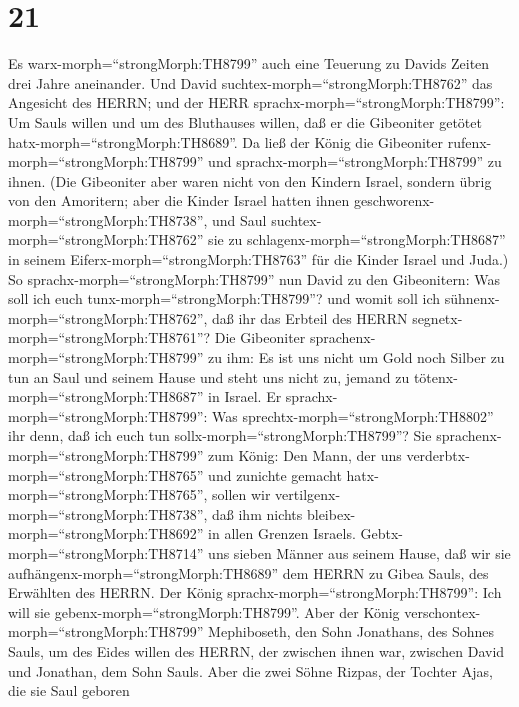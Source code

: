 \hypertarget{section-20}{%
\section{21}\label{section-20}}

 Es warx-morph=``strongMorph:TH8799'' auch eine Teuerung zu
Davids Zeiten drei Jahre aneinander. Und David
suchtex-morph=``strongMorph:TH8762'' das Angesicht des HERRN; und der
HERR sprachx-morph=``strongMorph:TH8799'': Um Sauls willen und um des
Bluthauses willen, daß er die Gibeoniter getötet
hatx-morph=``strongMorph:TH8689''.  Da ließ der König die
Gibeoniter rufenx-morph=``strongMorph:TH8799'' und
sprachx-morph=``strongMorph:TH8799'' zu ihnen. (Die Gibeoniter aber
waren nicht von den Kindern Israel, sondern übrig von den Amoritern;
aber die Kinder Israel hatten ihnen
geschworenx-morph=``strongMorph:TH8738'', und Saul
suchtex-morph=``strongMorph:TH8762'' sie zu
schlagenx-morph=``strongMorph:TH8687'' in seinem
Eiferx-morph=``strongMorph:TH8763'' für die Kinder Israel und Juda.)
 So sprachx-morph=``strongMorph:TH8799'' nun David zu den
Gibeonitern: Was soll ich euch tunx-morph=``strongMorph:TH8799''? und
womit soll ich sühnenx-morph=``strongMorph:TH8762'', daß ihr das Erbteil
des HERRN segnetx-morph=``strongMorph:TH8761''?  Die
Gibeoniter sprachenx-morph=``strongMorph:TH8799'' zu ihm: Es ist uns
nicht um Gold noch Silber zu tun an Saul und seinem Hause und steht uns
nicht zu, jemand zu tötenx-morph=``strongMorph:TH8687'' in Israel. Er
sprachx-morph=``strongMorph:TH8799'': Was
sprechtx-morph=``strongMorph:TH8802'' ihr denn, daß ich euch tun
sollx-morph=``strongMorph:TH8799''?  Sie
sprachenx-morph=``strongMorph:TH8799'' zum König: Den Mann, der uns
verderbtx-morph=``strongMorph:TH8765'' und zunichte gemacht
hatx-morph=``strongMorph:TH8765'', sollen wir
vertilgenx-morph=``strongMorph:TH8738'', daß ihm nichts
bleibex-morph=``strongMorph:TH8692'' in allen Grenzen Israels.
 Gebtx-morph=``strongMorph:TH8714'' uns sieben Männer aus
seinem Hause, daß wir sie aufhängenx-morph=``strongMorph:TH8689'' dem
HERRN zu Gibea Sauls, des Erwählten des HERRN. Der König
sprachx-morph=``strongMorph:TH8799'': Ich will sie
gebenx-morph=``strongMorph:TH8799''.  Aber der König
verschontex-morph=``strongMorph:TH8799'' Mephiboseth, den Sohn
Jonathans, des Sohnes Sauls, um des Eides willen des HERRN, der zwischen
ihnen war, zwischen David und Jonathan, dem Sohn Sauls. 
Aber die zwei Söhne Rizpas, der Tochter Ajas, die sie Saul geboren
